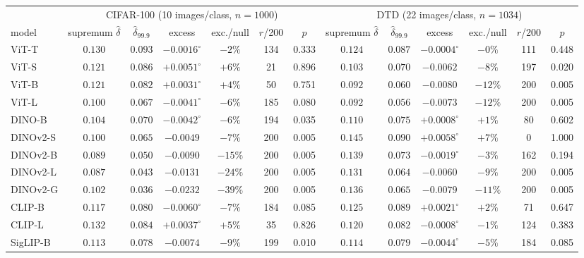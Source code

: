 \begin{table}[H]
\centering
\scriptsize
\setlength{\tabcolsep}{2.4pt}
\begin{tabular}{lcccccc|cccccc}
\toprule
& \multicolumn{6}{c|}{CIFAR-100 (10 images/class, $n{=}1000$)} & \multicolumn{6}{c}{DTD (22 images/class, $n{=}1034$)} \\
model & supremum $\hat\delta$ & $\hat\delta_{99.9}$ & excess & exc./null & $r$/200 & $p$ & supremum $\hat\delta$ & $\hat\delta_{99.9}$ & excess & exc./null & $r$/200 & $p$ \\
\midrule
ViT-T & $0.130$ & $0.093$ & $-0.0016^{\circ}$ & $-2\%$ & 134 & 0.333 & $0.124$ & $0.087$ & $-0.0004^{\circ}$ & $-0\%$ & 111 & 0.448 \\
ViT-S & $0.121$ & $0.086$ & $+0.0051^{\circ}$ & $+6\%$ & 21 & 0.896 & $0.103$ & $0.070$ & $-0.0062$ & $-8\%$ & 197 & 0.020 \\
ViT-B & $0.121$ & $0.082$ & $+0.0031^{\circ}$ & $+4\%$ & 50 & 0.751 & $0.092$ & $0.060$ & $-0.0080$ & $-12\%$ & 200 & 0.005 \\
ViT-L & $0.100$ & $0.067$ & $-0.0041^{\circ}$ & $-6\%$ & 185 & 0.080 & $0.092$ & $0.056$ & $-0.0073$ & $-12\%$ & 200 & 0.005 \\
\midrule
DINO-B & $0.104$ & $0.070$ & $-0.0042^{\circ}$ & $-6\%$ & 194 & 0.035 & $0.110$ & $0.075$ & $+0.0008^{\circ}$ & $+1\%$ & 80 & 0.602 \\
DINOv2-S & $0.100$ & $0.065$ & $-0.0049$ & $-7\%$ & 200 & 0.005 & $0.145$ & $0.090$ & $+0.0058^{\circ}$ & $+7\%$ & 0 & 1.000 \\
DINOv2-B & $0.089$ & $0.050$ & $-0.0090$ & $-15\%$ & 200 & 0.005 & $0.139$ & $0.073$ & $-0.0019^{\circ}$ & $-3\%$ & 162 & 0.194 \\
DINOv2-L & $0.087$ & $0.043$ & $-0.0131$ & $-24\%$ & 200 & 0.005 & $0.131$ & $0.064$ & $-0.0060$ & $-9\%$ & 200 & 0.005 \\
DINOv2-G & $0.102$ & $0.036$ & $-0.0232$ & $-39\%$ & 200 & 0.005 & $0.136$ & $0.065$ & $-0.0079$ & $-11\%$ & 200 & 0.005 \\
\midrule
CLIP-B & $0.117$ & $0.080$ & $-0.0060^{\circ}$ & $-7\%$ & 184 & 0.085 & $0.125$ & $0.089$ & $+0.0021^{\circ}$ & $+2\%$ & 71 & 0.647 \\
CLIP-L & $0.132$ & $0.084$ & $+0.0037^{\circ}$ & $+5\%$ & 35 & 0.826 & $0.120$ & $0.082$ & $-0.0008^{\circ}$ & $-1\%$ & 124 & 0.383 \\
SigLIP-B & $0.113$ & $0.078$ & $-0.0074$ & $-9\%$ & 199 & 0.010 & $0.114$ & $0.079$ & $-0.0044^{\circ}$ & $-5\%$ & 184 & 0.085 \\

\end{tabular}
\end{table}
